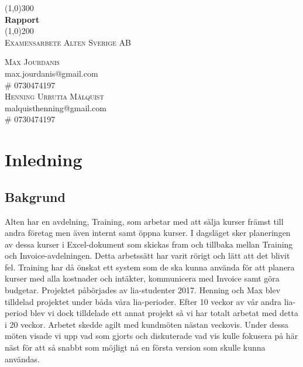 \documentclass{article}
\begin{document}
\begin{titlepage}
    \begin{center}
        \line(1,0){300}\\
        \huge{\bfseries Rapport  }\\
        \line(1,0){200}\\
        [1cm]
        \textsc{\LARGE Examensarbete Alten Sverige AB }\\
        [13cm]
    \end{center}
    \begin{flushright}
        \textsc{\Large Max Jourdanis \\}
        max.jourdanis@gmail.com\\
        \# 0730474197\\
        [4pt]
        \textsc{\Large Henning Urrutia Målquist \\}
        malquisthenning@gmail.com\\
        \# 0730474197
        
    \end{flushright}
    \end{titlepage}
\tableofcontents 

    \newpage
    
    \thispagestyle{empty}

    \cleardoublepage

    \setcounter{page}{1}
    
\section{Inledning}
    \subsection{Bakgrund}
    Alten har en avdelning, Training, som arbetar med att sälja kurser främst till andra företag men även internt samt öppna kurser. I dagsläget sker planeringen av dessa kurser i Excel-dokument som skickas fram och tillbaka mellan Training och Invoice-avdelningen. Detta arbetssätt har varit rörigt och lätt att det blivit fel. \newline
    Training har då önskat ett system som de ska kunna använda för att planera kurser med alla kostnader och intäkter, kommunicera med Invoice samt göra budgetar.\newline
    Projektet påbörjades av lia-studenter 2017. Henning och Max blev tilldelad projektet under båda våra lia-perioder.\newline
    Efter 10 veckor av vår andra lia-period blev vi dock tilldelade ett annat projekt så vi har totalt arbetat med detta i 20 veckor.\newline
    Arbetet skedde agilt med kundmöten nästan veckovis. Under dessa möten visade vi upp vad som gjorts och diskuterade vad vis kulle fokusera på här näst för att så snabbt som möjligt nå en första version som skulle kunna användas. 
\end{document}
